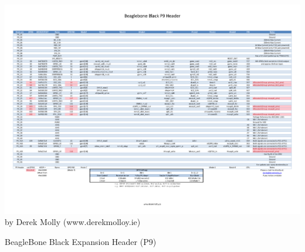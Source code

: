 \documentclass[12pt, twoside, a4paper]{scrbook}
\begin{document}
\begin{landscape}
  \begin{table}
  \centering
  \includegraphics[page=1, trim=8mm 26mm 8mm 25mm, clip=true, scale=0.8]{doc/BeagleboneBlackP9HeaderTable.pdf}\\
  \tiny by Derek Molly (www.derekmolloy.ie)
  \caption{BeagleBone Black Expansion Header (P9)}
  \end{table}
\end{landscape}



\end{document}
